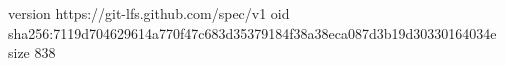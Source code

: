 version https://git-lfs.github.com/spec/v1
oid sha256:7119d704629614a770f47c683d35379184f38a38eca087d3b19d30330164034e
size 838
